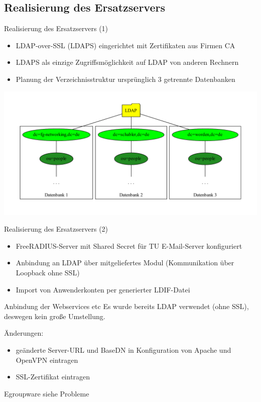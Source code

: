 \documentclass[handout,svgnames]{beamer}
\begin{document}
\subsection{Realisierung des Ersatzservers}
\begin{frame}{Realisierung des Ersatzservers (1)}
\begin{itemize}
	\item LDAP-over-SSL (LDAPS) eingerichtet mit Zertifikaten aus Firmen CA
	\item LDAPS als einzige Zugriffsmöglichkeit auf LDAP von anderen Rechnern
	\item Planung der Verzeichnisstruktur ursprünglich 3 getrennte Datenbanken
\end{itemize}
\includegraphics[width=\textwidth]{Bilder/LDAP-fgn-planned.pdf}
\end{frame}


\begin{frame}{Realisierung des Ersatzservers (2)}
\begin{itemize}
	\item FreeRADIUS-Server mit Shared Secret für TU E-Mail-Server konfiguriert
	\item Anbindung an LDAP über mitgeliefertes Modul (Kommunikation über Loopback ohne SSL)
	\item Import von Anwenderkonten per generierter LDIF-Datei
\end{itemize}
\end{frame}


\begin{frame}{Anbindung der Webservices etc}
Es wurde bereits LDAP verwendet (ohne SSL), deswegen kein große Umstellung.

Änderungen:
\begin{itemize}
	\item geänderte Server-URL und BaseDN in Konfiguration von Apache und OpenVPN eintragen
	\item SSL-Zertifikat eintragen
\end{itemize}
Egroupware siehe Probleme
\end{frame}
\end{document}
